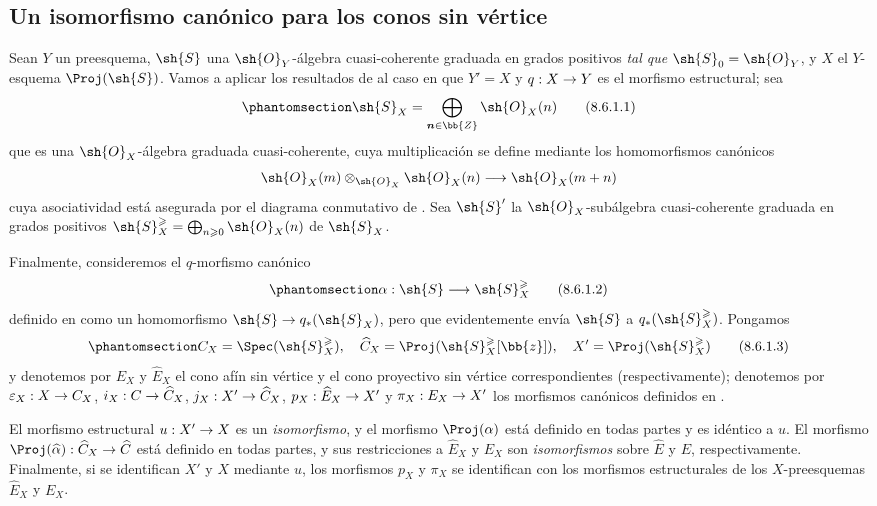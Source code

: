 \documentclass[oneside,10pt]{amsart}
\makeatletter
\renewcommand{\geq}{\geqslant}
\newcommand{\ega@arrow}[2]{\mathchoice{#1}{#2}{#2}{#2}}
\renewcommand{\to}{\ega@arrow{\longrightarrow}{\rightarrow}}
\newcommand{\oldpage}[2][]{\marginnote{\normalfont\footnotesize\textbf{#1}~|~#2}\ignorespaces}
\let\EGAOriginalLabel\label
\renewcommand{\label}[1]{\phantomsection\EGAOriginalLabel{#1}}
\makeatother
\begin{document}
\subsection{Un isomorfismo canónico para los conos sin vértice}
\label{subsection:II.8.6}

\begin{env}[8.6.1]
\label{II.8.6.1}
Sean $Y$ un preesquema, $\sh{S}$ una $\sh{O}_Y$-álgebra cuasi-coherente graduada en grados positivos \emph{tal que $\sh{S}_0=\sh{O}_Y$}, y $X$ el $Y$-esquema $\Proj(\sh{S})$.
Vamos a aplicar los resultados de  al caso en que $Y'=X$ y $q:X\to Y$ es el morfismo estructural;
sea
\[
\label{II.8.6.1.1}
  \sh{S}_X=\bigoplus_{\boldsymbol n\in\bb{Z}}\sh{O}_X(n)
  \tag{8.6.1.1}
\]
\oldpage[II]{172}
que es una $\sh{O}_X$-álgebra graduada cuasi-coherente, cuya multiplicación se define mediante los homomorfismos canónicos 
\[
  \sh{O}_X(m)\otimes_{\sh{O}_X}\sh{O}_X(n)\to\sh{O}_X(m+n)
\]
cuya asociatividad está asegurada por el diagrama conmutativo de .
Sea $\sh{S}'$ la $\sh{O}_X$-subálgebra cuasi-coherente graduada en grados positivos $\sh{S}_X^\geq=\bigoplus_{n\geq0}\sh{O}_X(n)$ de $\sh{S}_X$.

Finalmente, consideremos el $q$-morfismo canónico
\[
\label{II.8.6.1.2}
  \alpha: \sh{S} \to \sh{S}_X^\geq
\tag{8.6.1.2}
\]
definido en  como un homomorfismo $\sh{S}\to q_*(\sh{S}_X)$, pero que evidentemente envía $\sh{S}$ a $q_*(\sh{S}_X^\geq)$.
Pongamos
\[
\label{II.8.6.1.3}
  C_X = \Spec(\sh{S}_X^\geq),
  \quad
  \widehat{C}_X = \Proj(\sh{S}_X^\geq[\bb{z}]),
  \quad
  X' = \Proj(\sh{S}_X^\geq)
\tag{8.6.1.3}
\]
y denotemos por $E_X$ y $\widehat{E}_X$ el cono afín sin vértice y el cono proyectivo sin vértice correspondientes (respectivamente);
denotemos por $\varepsilon_X:X\to C_X$, $i_X:C\to\widehat{C}_X$, $j_X:X'\to\widehat{C}_X$, $p_X:\widehat{E}_X\to X'$ y $\pi_X:E_X\to X'$ los morfismos canónicos definidos en .
\end{env}
\begin{proposition}[8.6.2]
\label{II.8.6.2}
El morfismo estructural $u:X'\to X$ es un \emph{isomorfismo}, y el morfismo $\Proj(\alpha)$ está definido en todas partes y es idéntico a $u$.
El morfismo $\Proj(\widehat{\alpha}):\widehat{C}_X\to\widehat{C}$ está definido en todas partes, y sus restricciones a $\widehat{E}_X$ y $E_X$ son \emph{isomorfismos} sobre $\widehat{E}$ y $E$, respectivamente.
Finalmente, si se identifican $X'$ y $X$ mediante $u$, los morfismos $p_X$ y $\pi_X$ se identifican con los morfismos estructurales de los $X$-preesquemas $\widehat{E}_X$ y $E_X$.
\end{proposition}
\end{document}
